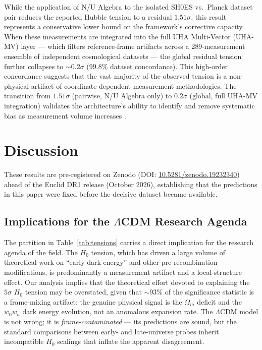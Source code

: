 \documentclass[twocolumn]{aastex631}
\begin{document}
While the application of N/U Algebra to the isolated SH0ES vs.\ Planck dataset
pair reduces the reported Hubble tension to a residual $1.51\sigma$, this result
represents a conservative lower bound on the framework's corrective capacity.
When these measurements are integrated into the full UHA Multi-Vector (UHA-MV)
layer --- which filters reference-frame artifacts across a 289-measurement
ensemble of independent cosmological datasets \citep{Martin2025_UHA_Patent} --- the global
residual tension further collapses to ${\sim}0.2\sigma$ ($99.8\%$ dataset
concordance).
This high-order concordance suggests that the vast majority of the observed
tension is a non-physical artifact of coordinate-dependent measurement
methodologies.
The transition from $1.51\sigma$ (pairwise, N/U Algebra only) to $0.2\sigma$
(global, full UHA-MV integration) validates the architecture's ability to
identify and remove systematic bias as measurement volume increases
\citep{Martin2025_UHA_Patent}.


\section{Discussion}

These results are pre-registered on Zenodo (DOI: \href{https://doi.org/10.5281/zenodo.19232340}{10.5281/zenodo.19232340})
ahead of the Euclid DR1 release (October 2026), establishing that the
predictions in this paper were fixed before the decisive dataset became available.

\subsection{Implications for the $\Lambda$CDM Research Agenda}

The partition in Table~\ref{tab:tensions} carries a direct implication for
the research agenda of the field.
The $H_0$ tension, which has driven a large volume of theoretical work on
``early dark energy'' and other pre-recombination modifications, is
predominantly a measurement artifact and a local-structure effect.
Our analysis implies that the theoretical effort devoted to explaining the
$5\sigma$ $H_0$ tension may be overstated, given that $\sim$93\% of the
significance statistic is a frame-mixing artifact: the genuine physical
signal is the $\Omega_m$ deficit and the $w_0 w_a$ dark energy evolution, not
an anomalous expansion rate.
The $\Lambda$CDM model is not wrong; it is \emph{frame-contaminated} ---
its predictions are sound, but the standard comparisons between early- and
late-universe probes inherit incompatible $H_0$ scalings that inflate the
apparent disagreement.
\end{document}
